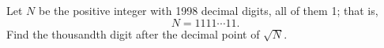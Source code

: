 Let $N$ be the positive integer with 1998 decimal digits, all of them 1;
that is,
\[N=1111\cdots 11.\]
Find the thousandth digit after the decimal point of $\sqrt N$.
